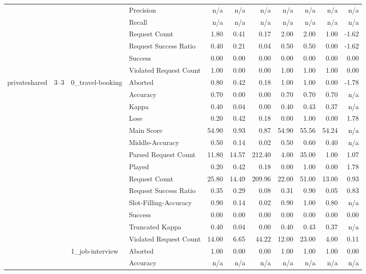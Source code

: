 \begin{tabular}{llllrrrrrrr}
 &  &  & Precision & n/a & n/a & n/a & n/a & n/a & n/a & n/a \\
 &  &  & Recall & n/a & n/a & n/a & n/a & n/a & n/a & n/a \\
 &  &  & Request Count & 1.80 & 0.41 & 0.17 & 2.00 & 2.00 & 1.00 & -1.62 \\
 &  &  & Request Success Ratio & 0.40 & 0.21 & 0.04 & 0.50 & 0.50 & 0.00 & -1.62 \\
 &  &  & Success & 0.00 & 0.00 & 0.00 & 0.00 & 0.00 & 0.00 & 0.00 \\
 &  &  & Violated Request Count & 1.00 & 0.00 & 0.00 & 1.00 & 1.00 & 1.00 & 0.00 \\
\cline{1-11} \cline{2-11} \cline{3-11}
\multirow[t]{605}{*}{privateshared} & \multirow[t]{69}{*}{3--3} & \multirow[t]{14}{*}{0_travel-booking} & Aborted & 0.80 & 0.42 & 0.18 & 1.00 & 1.00 & 0.00 & -1.78 \\
 &  &  & Accuracy & 0.70 & 0.00 & 0.00 & 0.70 & 0.70 & 0.70 & n/a \\
 &  &  & Kappa & 0.40 & 0.04 & 0.00 & 0.40 & 0.43 & 0.37 & n/a \\
 &  &  & Lose & 0.20 & 0.42 & 0.18 & 0.00 & 1.00 & 0.00 & 1.78 \\
 &  &  & Main Score & 54.90 & 0.93 & 0.87 & 54.90 & 55.56 & 54.24 & n/a \\
 &  &  & Middle-Accuracy & 0.50 & 0.14 & 0.02 & 0.50 & 0.60 & 0.40 & n/a \\
 &  &  & Parsed Request Count & 11.80 & 14.57 & 212.40 & 4.00 & 35.00 & 1.00 & 1.07 \\
 &  &  & Played & 0.20 & 0.42 & 0.18 & 0.00 & 1.00 & 0.00 & 1.78 \\
 &  &  & Request Count & 25.80 & 14.49 & 209.96 & 22.00 & 51.00 & 13.00 & 0.93 \\
 &  &  & Request Success Ratio & 0.35 & 0.29 & 0.08 & 0.31 & 0.90 & 0.05 & 0.83 \\
 &  &  & Slot-Filling-Accuracy & 0.90 & 0.14 & 0.02 & 0.90 & 1.00 & 0.80 & n/a \\
 &  &  & Success & 0.00 & 0.00 & 0.00 & 0.00 & 0.00 & 0.00 & 0.00 \\
 &  &  & Truncated Kappa & 0.40 & 0.04 & 0.00 & 0.40 & 0.43 & 0.37 & n/a \\
 &  &  & Violated Request Count & 14.00 & 6.65 & 44.22 & 12.00 & 23.00 & 4.00 & 0.11 \\
\cline{3-11}
 &  & \multirow[t]{13}{*}{1_job-interview} & Aborted & 1.00 & 0.00 & 0.00 & 1.00 & 1.00 & 1.00 & 0.00 \\
 &  &  & Accuracy & n/a & n/a & n/a & n/a & n/a & n/a & n/a \\

\end{tabular}
